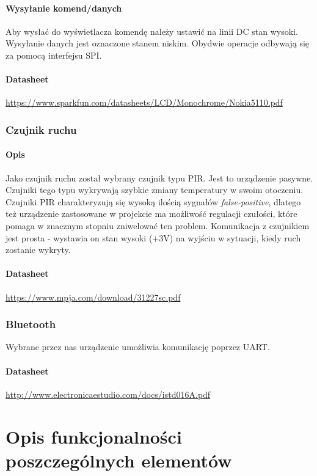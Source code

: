 \documentclass{article}
\begin{document}
\paragraph{Wysyłanie komend/danych}
Aby wysłać do wyświetlacza komendę należy ustawić na linii DC stan wysoki. Wysyłanie danych
jest oznaczone stanem niskim. Obydwie operacje odbywają się za pomocą interfejsu SPI.
\paragraph{Datasheet}
\url{https://www.sparkfun.com/datasheets/LCD/Monochrome/Nokia5110.pdf}

\subsubsection{Czujnik ruchu}

\paragraph{Opis}
Jako czujnik ruchu został wybrany czujnik typu PIR. Jest to urządzenie pasywne.
Czujniki tego typu wykrywają szybkie zmiany temperatury w swoim otoczeniu. Czujniki
PIR charakteryzują się wysoką ilością sygnałów \emph{false-positive}, dlatego też
urządzenie zastosowane w projekcie ma możliwość regulacji czułości, które pomaga
w znacznym stopniu zniwelować ten problem. Komunikacja z czujnikiem jest prosta - wystawia
on stan wysoki (+3V) na wyjściu w sytuacji, kiedy ruch zostanie wykryty.

\paragraph{Datasheet}
\url{https://www.mpja.com/download/31227sc.pdf}

\subsubsection{Bluetooth}
Wybrane przez nas urządzenie umożliwia komunikację poprzez UART.

\paragraph{Datasheet}
\url{http://www.electronicaestudio.com/docs/istd016A.pdf}

\section{Opis funkcjonalności poszczególnych elementów}
\end{document}
